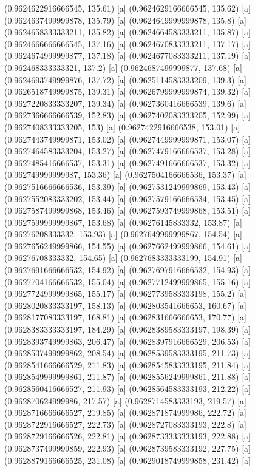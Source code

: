 {{{(0.9624622916666545, 135.61) [a] 
(0.9624629166666545, 135.62) [a] 
(0.9624637499999878, 135.79) [a] 
(0.9624649999999878, 135.8) [a] 
(0.9624658333333211, 135.82) [a] 
(0.9624664583333211, 135.87) [a] 
(0.9624666666666545, 137.16) [a] 
(0.9624670833333211, 137.17) [a] 
(0.9624674999999877, 137.18) [a] 
(0.9624677083333211, 137.19) [a] 
(0.962468333333321, 137.2) [a] 
(0.9624687499999877, 137.68) [a] 
(0.9624693749999876, 137.72) [a] 
(0.9625114583333209, 139.3) [a] 
(0.9626518749999875, 139.31) [a] 
(0.9626799999999874, 139.32) [a] 
(0.9627220833333207, 139.34) [a] 
(0.9627360416666539, 139.6) [a] 
(0.9627366666666539, 152.83) [a] 
(0.9627402083333205, 152.99) [a] 
(0.9627408333333205, 153) [a] 
(0.9627422916666538, 153.01) [a] 
(0.9627443749999871, 153.02) [a] 
(0.9627449999999871, 153.07) [a] 
(0.9627464583333204, 153.27) [a] 
(0.9627479166666537, 153.28) [a] 
(0.9627485416666537, 153.31) [a] 
(0.9627491666666537, 153.32) [a] 
(0.962749999999987, 153.36) [a] 
(0.9627504166666536, 153.37) [a] 
(0.9627516666666536, 153.39) [a] 
(0.9627531249999869, 153.43) [a] 
(0.9627552083333202, 153.44) [a] 
(0.9627579166666534, 153.45) [a] 
(0.9627587499999868, 153.46) [a] 
(0.9627593749999868, 153.51) [a] 
(0.9627599999999867, 153.68) [a] 
(0.96276145833332, 153.87) [a] 
(0.96276208333332, 153.93) [a] 
(0.9627649999999867, 154.54) [a] 
(0.9627656249999866, 154.55) [a] 
(0.9627662499999866, 154.61) [a] 
(0.96276708333332, 154.65) [a] 
(0.9627683333333199, 154.91) [a] 
(0.9627691666666532, 154.92) [a] 
(0.9627697916666532, 154.93) [a] 
(0.9627704166666532, 155.04) [a] 
(0.9627712499999865, 155.16) [a] 
(0.9627724999999865, 155.17) [a] 
(0.9627739583333198, 155.2) [a] 
(0.9628020833333197, 158.13) [a] 
(0.962803541666653, 160.67) [a] 
(0.9628177083333197, 168.81) [a] 
(0.962831666666653, 170.77) [a] 
(0.9628383333333197, 184.29) [a] 
(0.9628389583333197, 198.39) [a] 
(0.9628393749999863, 206.47) [a] 
(0.9628397916666529, 206.53) [a] 
(0.9628537499999862, 208.54) [a] 
(0.9628539583333195, 211.73) [a] 
(0.9628541666666529, 211.83) [a] 
(0.9628545833333195, 211.84) [a] 
(0.9628549999999861, 211.87) [a] 
(0.9628556249999861, 211.88) [a] 
(0.9628560416666527, 211.93) [a] 
(0.9628564583333193, 212.22) [a] 
(0.962870624999986, 217.57) [a] 
(0.9628714583333193, 219.57) [a] 
(0.9628716666666527, 219.85) [a] 
(0.962871874999986, 222.72) [a] 
(0.9628722916666527, 222.73) [a] 
(0.9628727083333193, 222.8) [a] 
(0.9628729166666526, 222.81) [a] 
(0.9628733333333193, 222.88) [a] 
(0.9628737499999859, 222.93) [a] 
(0.9628739583333192, 227.75) [a] 
(0.9628879166666525, 231.08) [a] 
(0.9629018749999858, 231.42) [a] 
}}}
